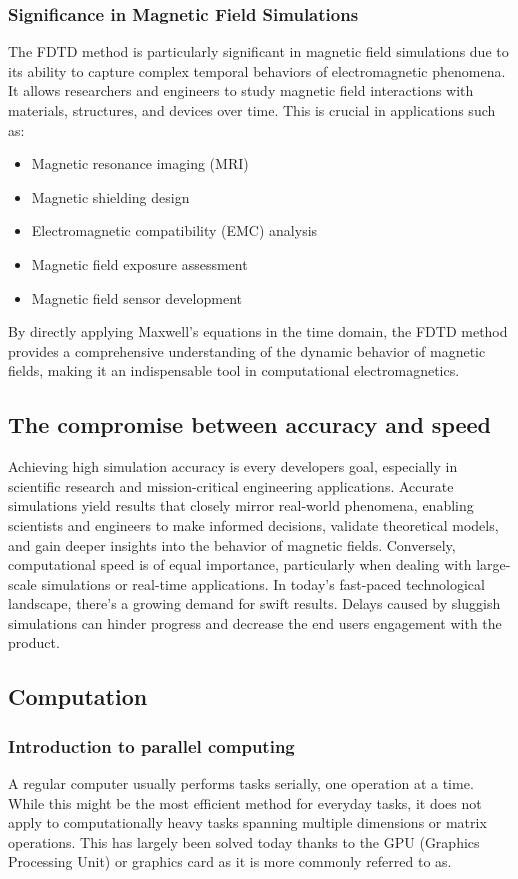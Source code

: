 \documentclass[11pt, a4paper, titlepage]{article}
\begin{document}
\subsubsection{Significance in Magnetic Field Simulations}
The FDTD method is particularly significant in magnetic field simulations due to its ability to capture complex temporal behaviors of electromagnetic phenomena. It allows researchers and engineers to study magnetic field interactions with materials, structures, and devices over time. This is crucial in applications such as:
\begin{itemize}
	\item Magnetic resonance imaging (MRI)
	\item Magnetic shielding design
	\item Electromagnetic compatibility (EMC) analysis
	\item Magnetic field exposure assessment
	\item Magnetic field sensor development
\end{itemize}
By directly applying Maxwell's equations in the time domain, the FDTD method provides a comprehensive understanding of the dynamic behavior of magnetic fields, making it an indispensable tool in computational electromagnetics. 
\subsection{The compromise between accuracy and speed}
Achieving high simulation accuracy is every developers goal, especially in scientific research and mission-critical engineering applications. Accurate simulations yield results that closely mirror real-world phenomena, enabling scientists and engineers to make informed decisions, validate theoretical models, and gain deeper insights into the behavior of magnetic fields. 
Conversely, computational speed is of equal importance, particularly when dealing with large-scale simulations or real-time applications. In today's fast-paced technological landscape, there's a growing demand for swift results. Delays caused by sluggish simulations can hinder progress and decrease the end users engagement with the product. 

\newpage
\subsection{Computation}
\subsubsection{Introduction to parallel computing}
A regular computer usually performs tasks serially, one operation at a time. While this might be the most efficient method for everyday tasks, it does not apply to computationally heavy tasks spanning multiple dimensions or matrix operations. This has largely been solved today thanks to the GPU (Graphics Processing Unit) or graphics card as it is more commonly referred to as.
\end{document}
